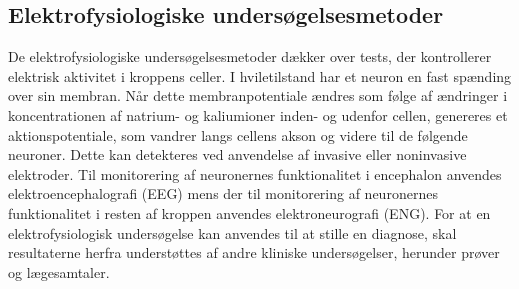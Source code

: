 \subsection{Elektrofysiologiske undersøgelsesmetoder}
De elektrofysiologiske undersøgelsesmetoder dækker over tests, der kontrollerer elektrisk aktivitet i kroppens celler. I hviletilstand har et neuron en fast spænding over sin membran. Når dette membranpotentiale ændres som følge af ændringer i koncentrationen af natrium- og kaliumioner inden- og udenfor cellen, genereres et aktionspotentiale, som vandrer langs cellens akson og videre til de følgende neuroner. Dette kan detekteres ved anvendelse af invasive eller noninvasive elektroder. Til monitorering af neuronernes funktionalitet i encephalon anvendes elektroencephalografi (EEG) mens der til monitorering af neuronernes funktionalitet i resten af kroppen anvendes elektroneurografi (ENG). For at en elektrofysiologisk undersøgelse kan anvendes til at stille en diagnose, skal resultaterne herfra understøttes af andre kliniske undersøgelser, herunder prøver og lægesamtaler. \citep{Robinson2008} 


